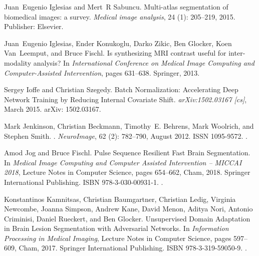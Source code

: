 \documentclass{midl}
\begin{document}
\begin{thebibliography}{50}
Juan~Eugenio Iglesias and Mert~R Sabuncu.
\newblock Multi-atlas segmentation of biomedical images: a survey.
\newblock \emph{Medical image analysis}, 24 (1): 205--219,
  2015.
\newblock Publisher: Elsevier.

Juan~Eugenio Iglesias, Ender Konukoglu, Darko Zikic, Ben Glocker, Koen
  Van~Leemput, and Bruce Fischl.
\newblock Is synthesizing {MRI} contrast useful for inter-modality analysis?
\newblock In \emph{International {Conference} on {Medical} {Image} {Computing}
  and {Computer}-{Assisted} {Intervention}}, pages 631--638. Springer, 2013.

Sergey Ioffe and Christian Szegedy.
\newblock Batch {Normalization}: {Accelerating} {Deep} {Network} {Training} by
  {Reducing} {Internal} {Covariate} {Shift}.
\newblock \emph{arXiv:1502.03167 [cs]}, March 2015.
\newblock arXiv: 1502.03167.

Mark Jenkinson, Christian Beckmann, Timothy~E. Behrens, Mark Woolrich, and
  Stephen Smith.
.
\newblock \emph{NeuroImage}, 62 (2): 782--790, August 2012.
\newblock ISSN 1095-9572.
\newblock {}.

Amod Jog and Bruce Fischl.
\newblock Pulse {Sequence} {Resilient} {Fast} {Brain} {Segmentation}.
\newblock In \emph{Medical {Image} {Computing} and {Computer} {Assisted}
  {Intervention} – {MICCAI} 2018}, Lecture {Notes} in {Computer} {Science},
  pages 654--662, Cham, 2018. Springer International Publishing.
\newblock ISBN 978-3-030-00931-1.
\newblock {}.

Konstantinos Kamnitsas, Christian Baumgartner, Christian Ledig, Virginia
  Newcombe, Joanna Simpson, Andrew Kane, David Menon, Aditya Nori, Antonio
  Criminisi, Daniel Rueckert, and Ben Glocker.
\newblock Unsupervised {Domain} {Adaptation} in {Brain} {Lesion} {Segmentation}
  with {Adversarial} {Networks}.
\newblock In \emph{Information {Processing} in {Medical} {Imaging}}, Lecture
  {Notes} in {Computer} {Science}, pages 597--609, Cham, 2017{}.
  Springer International Publishing.
\newblock ISBN 978-3-319-59050-9.
\newblock {}.


\end{thebibliography}
\end{document}
